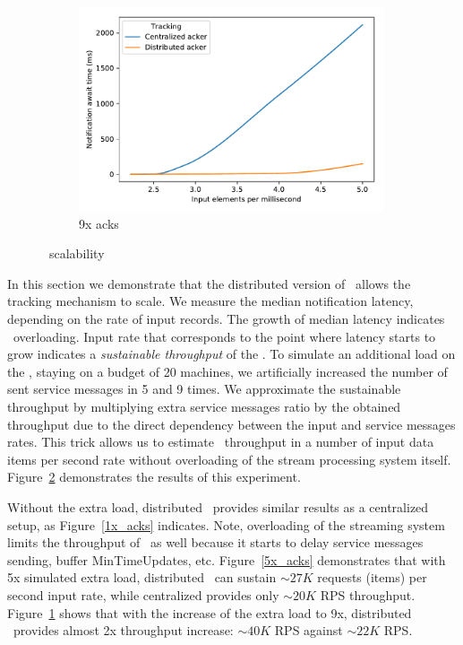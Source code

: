 \begin{figure}[t!]
    \begin{subfigure}[b]{0.32\textwidth}
            \includegraphics[width=0.99\textwidth]{pics/scalability_09x.pdf}
            \caption{9x acks}
            \label{9x_acks}
    \end{subfigure}
    \caption{\tracker\ scalability}
    \label{notification_scalability}
\end{figure}
In this section we demonstrate that the distributed version of \tracker\ allows the tracking mechanism to scale. We measure the median notification latency, depending on the rate of input records. The growth of median latency indicates \tracker\ overloading. Input rate that corresponds to the point where latency starts to grow indicates a {\em sustainable throughput} of the \tracker. To simulate an additional load on the \tracker, staying on a budget of 20 machines, we artificially increased the number of sent service messages in 5 and 9 times. We approximate the sustainable throughput by multiplying extra service messages ratio by the obtained throughput due to the direct dependency between the input and service messages rates. This trick allows us to estimate \tracker\ throughput in a number of input data items per second rate without overloading of the stream processing system itself. Figure~\ref{notification_scalability} demonstrates the results of this experiment.

Without the extra load, distributed \tracker\ provides similar results as a centralized setup, as Figure~\ref{1x_acks} indicates. Note, overloading of the streaming system limits the throughput of \tracker\ as well because it starts to delay service messages sending, buffer MinTimeUpdates, etc. Figure~\ref{5x_acks} demonstrates that with 5x simulated extra load, distributed \tracker\ can sustain $\sim 27K$ requests (items) per second input rate, while centralized provides only $\sim 20K$ RPS throughput. Figure~\ref{9x_acks} shows that with the increase of the extra load to 9x, distributed \tracker\ provides almost 2x throughput increase: $\sim 40K$ RPS against $\sim 22K$ RPS. 

